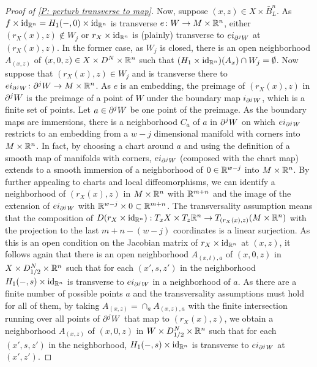 \begin{proof}[Proof of \cref{P: perturb transverse to map}]
	Now, suppose $(x,z) \in X \times \bar B^n_L$.
	As $f \times \mathrm{id}_{\mathbb{R}^n} = H_1(-,0) \times \mathrm{id}_{\mathbb{R}^n}$ is transverse $e \colon W \to M \times \mathbb{R}^n$, either $(r_X(x),z)\notin W_j$ or $r_X \times \mathrm{id}_{\mathbb{R}^n}$ is (plainly) transverse to $ei_{\partial^jW}$ at $(r_X(x),z)$.
	In the former case, as $W_j$ is closed, there is an open neighborhood $A_{(x,z)}$ of $(x,0,z) \in X \times D^N \times \mathbb{R}^n$ such that $(H_1 \times \mathrm{id}_{\mathbb{R}^n})(A_x) \cap W_j = \emptyset$.
	Now suppose that $(r_X(x),z) \in W_j$ and is transverse there to $ei_{\partial^jW} \colon \partial^jW \to M \times \mathbb{R}^n$.
	As $e$ is an embedding, the preimage of $(r_X(x),z)$ in $\partial^jW$ is the preimage of a point of $W$ under the boundary map $i_{\partial^jW}$, which is a finite set of points.
	Let $a \in \partial^jW$ be one point of the preimage.
	As the boundary maps are immersions, there is a neighborhood $C_a$ of $a$ in $\partial^jW$ on which $ei_{\partial^jW}$ restricts to an embedding from a $w-j$ dimensional manifold with corners into $M \times \mathbb{R}^n$.
	In fact, by choosing a chart around $a$ and using the definition of a smooth map of manifolds with corners, $ei_{\partial^jW}$ (composed with the chart map) extends to a smooth immersion of a neighborhood of $0 \in \mathbb{R}^{w-j}$ into $M \times \mathbb{R}^n$.
	By further appealing to charts and local diffeomorphisms, we can identify a neighborhood of $(r_X(x),z)$ in $M \times \mathbb{R}^n$ with $\mathbb{R}^{m+n}$ and the image of the extension of $ei_{\partial^jW}$ with $\mathbb{R}^{w-j} \times 0 \subset \mathbb{R}^{m+n}$.
	The transversality assumption means that the composition of $D(r_X \times \mathrm{id}_{\mathbb{R}^n}):T_xX \times T_z\mathbb{R}^n
	\to T_{(r_X(x),z)}(M \times \mathbb{R}^n)$ with the projection to the last $m+n-(w-j)$ coordinates is a linear surjection.
	As this is an open condition on the Jacobian matrix of $r_X \times \mathrm{id}_{\mathbb{R}^n}$ at $(x,z)$, it follows again that there is an open neighborhood $A_{(x,t),a}$ of $(x,0,z)$ in $X \times D_{1/2}^N \times \mathbb{R}^n$ such that for each $(x',s,z')$ in the neighborhood $H_1(-,s) \times \mathrm{id}_{\mathbb{R}^n}$ is transverse to $ei_{\partial^jW}$ in a neighborhood of $a$.
	As there are a finite number of possible points $a$ and the transversality assumptions must hold for all of them, by taking $A_{(x,z)} = \cap_a A_{(x,z),a}$ with the finite intersection running over all points of $\partial^jW$ that map to $(r_X(x),z)$, we obtain a neighborhood $A_{(x,z)}$ of $(x,0,z)$ in $W \times D_{1/2}^N \times \mathbb{R}^n$ such that for each $(x',s,z')$ in the neighborhood, $H_1(-,s) \times \mathrm{id}_{\mathbb{R}^n}$ is transverse to $ei_{\partial^jW}$ at $(x',z')$.


\end{proof}
